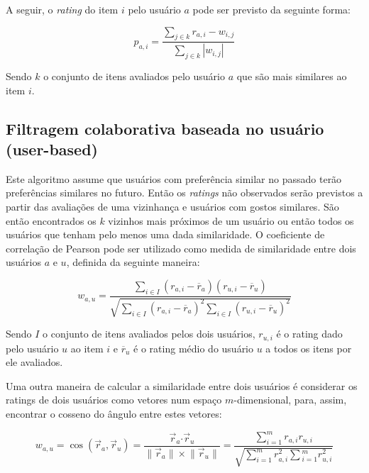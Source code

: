 \documentclass[12pt,a4paper,header]{abnt}
\begin{document}
A seguir, o \textit{rating} do item $i$ pelo usuário $a$ pode ser previsto da seguinte forma\cite{melville2011recommender}:

\begin{equation}
p_{a, i} = \frac{\sum_{j \in k}{r_{a, i} - w_{i, j}}}{\sum_{j \in k}{\left|w_{i, j}\right|}}
\end{equation}

Sendo $k$ o conjunto de itens avaliados pelo usuário $a$ que são mais similares ao item $i$.

\subsection{Filtragem colaborativa baseada no usuário (user-based)}

Este algoritmo assume que usuários com preferência similar no passado terão preferências similares no futuro. Então os \textit{ratings} não observados serão previstos a partir das avaliações de uma vizinhança e usuários com gostos similares\cite{hahsler2015recommenderlab}. São então encontrados os $k$ vizinhos mais próximos de um usuário ou então todos os usuários que tenham pelo menos uma dada similaridade. O coeficiente de correlação de Pearson pode ser utilizado como medida de similaridade entre dois usuários $a$ e $u$, definida da seguinte maneira\cite{melville2011recommender}:

\begin{equation}
w_{a, u} = \frac{\sum_{i \in I}{(r_{a, i} - \overline{r}_a ) ( r_{u, i} - \overline{r}_u )}}{\sqrt{\sum_{i \in I}{(r_{a, i} - \overline{r}_a )^2} \sum_{i \in I}{(r_{u, i} - \overline{r}_u )^2}}}
\end{equation}

Sendo $I$ o conjunto de itens avaliados pelos dois usuários, $r_{u, i}$ é o rating dado pelo usuário $u$ ao item $i$ e $\overline{r}_u$ é o rating médio do usuário $u$ a todos os itens por ele avaliados. 

Uma outra maneira de calcular a similaridade entre dois usuários é considerar os ratings de dois usuários como vetores num espaço $m$-dimensional, para, assim, encontrar o cosseno do ângulo entre estes vetores\cite{melville2011recommender}:

\begin{equation}
w_{a, u} = \cos({\vec{r}_a, \vec{r}_u}) = \frac{\vec{r}_a \boldsymbol{\cdot} \vec{r}_u}{\lVert \vec{r}_a\rVert \times \lVert \vec{r}_u\rVert} = \frac{\sum_{i=1}^{m}{r_{a, i} r_{u, i}}}{\sqrt{\sum_{i=1}^{m}{r^2_{a, i}} \sum{_{i=1}^{m}{r^2_{u, i}}}}}
\end{equation}
\end{document}
